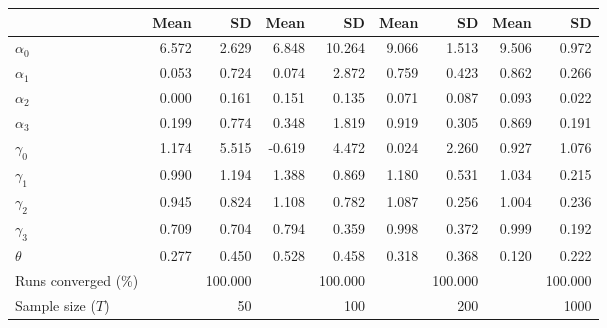 
\begin{tabular}[t]{lrrrrrrrr}
\toprule
  & Mean & SD & Mean  & SD  & Mean   & SD   & Mean    & SD   \\
\midrule
$\alpha_{0}$ & 6.572 & 2.629 & 6.848 & 10.264 & 9.066 & 1.513 & 9.506 & 0.972\\
$\alpha_{1}$ & 0.053 & 0.724 & 0.074 & 2.872 & 0.759 & 0.423 & 0.862 & 0.266\\
$\alpha_{2}$ & 0.000 & 0.161 & 0.151 & 0.135 & 0.071 & 0.087 & 0.093 & 0.022\\
$\alpha_{3}$ & 0.199 & 0.774 & 0.348 & 1.819 & 0.919 & 0.305 & 0.869 & 0.191\\
$\gamma_{0}$ & 1.174 & 5.515 & -0.619 & 4.472 & 0.024 & 2.260 & 0.927 & 1.076\\
$\gamma_{1}$ & 0.990 & 1.194 & 1.388 & 0.869 & 1.180 & 0.531 & 1.034 & 0.215\\
$\gamma_{2}$ & 0.945 & 0.824 & 1.108 & 0.782 & 1.087 & 0.256 & 1.004 & 0.236\\
$\gamma_{3}$ & 0.709 & 0.704 & 0.794 & 0.359 & 0.998 & 0.372 & 0.999 & 0.192\\
$\theta$ & 0.277 & 0.450 & 0.528 & 0.458 & 0.318 & 0.368 & 0.120 & 0.222\\
Runs converged (\%) &  & 100.000 &  & 100.000 &  & 100.000 &  & 100.000\\
Sample size ($T$) &  & 50 &  & 100 &  & 200 &  & 1000\\
\bottomrule
\end{tabular}
